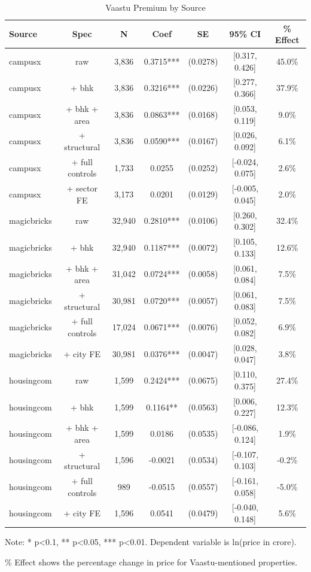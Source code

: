 \begin{table}[htbp]
\centering
\caption{Vaastu Premium by Source}
\begin{tabular}{lcccccc}
\toprule
Source & Spec & N & Coef & SE & 95\% CI & \% Effect \\
\midrule
campusx & raw & 3,836 & 0.3715*** & (0.0278) & [0.317, 0.426] & 45.0\% \\
campusx & + bhk & 3,836 & 0.3216*** & (0.0226) & [0.277, 0.366] & 37.9\% \\
campusx & + bhk + area & 3,836 & 0.0863*** & (0.0168) & [0.053, 0.119] & 9.0\% \\
campusx & + structural & 3,836 & 0.0590*** & (0.0167) & [0.026, 0.092] & 6.1\% \\
campusx & + full controls & 1,733 & 0.0255 & (0.0252) & [-0.024, 0.075] & 2.6\% \\
campusx & + sector FE & 3,173 & 0.0201 & (0.0129) & [-0.005, 0.045] & 2.0\% \\
magicbricks & raw & 32,940 & 0.2810*** & (0.0106) & [0.260, 0.302] & 32.4\% \\
magicbricks & + bhk & 32,940 & 0.1187*** & (0.0072) & [0.105, 0.133] & 12.6\% \\
magicbricks & + bhk + area & 31,042 & 0.0724*** & (0.0058) & [0.061, 0.084] & 7.5\% \\
magicbricks & + structural & 30,981 & 0.0720*** & (0.0057) & [0.061, 0.083] & 7.5\% \\
magicbricks & + full controls & 17,024 & 0.0671*** & (0.0076) & [0.052, 0.082] & 6.9\% \\
magicbricks & + city FE & 30,981 & 0.0376*** & (0.0047) & [0.028, 0.047] & 3.8\% \\
housingcom & raw & 1,599 & 0.2424*** & (0.0675) & [0.110, 0.375] & 27.4\% \\
housingcom & + bhk & 1,599 & 0.1164** & (0.0563) & [0.006, 0.227] & 12.3\% \\
housingcom & + bhk + area & 1,599 & 0.0186 & (0.0535) & [-0.086, 0.124] & 1.9\% \\
housingcom & + structural & 1,596 & -0.0021 & (0.0534) & [-0.107, 0.103] & -0.2\% \\
housingcom & + full controls & 989 & -0.0515 & (0.0557) & [-0.161, 0.058] & -5.0\% \\
housingcom & + city FE & 1,596 & 0.0541 & (0.0479) & [-0.040, 0.148] & 5.6\% \\
\bottomrule
\end{tabular}
\begin{tablenotes}
\small
\item Note: * p<0.1, ** p<0.05, *** p<0.01. Dependent variable is ln(price in crore).
\item \% Effect shows the percentage change in price for Vaastu-mentioned properties.
\end{tablenotes}
\end{table}